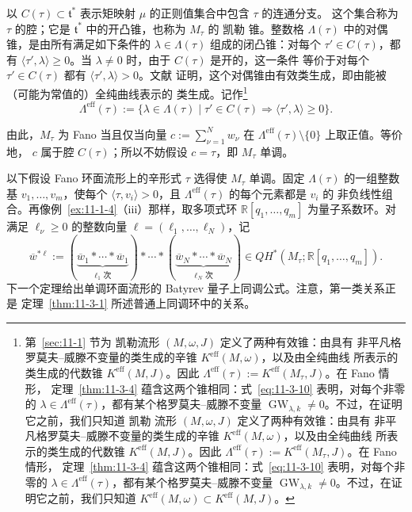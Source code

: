 以 $C(\tau)\subset\mathfrak t^*$ 表示矩映射 $\mu$ 的正则值集合中包含 $\tau$ 的连通分支。
这个集合称为 $\tau$ 的腔；它是 $\mathfrak t^*$ 中的开凸锥，也称为 $M_\tau$ 的 凯勒
锥。整数格 $\Lambda(\tau)$ 中的对偶锥，是由所有满足如下条件的
$\lambda\in\Lambda(\tau)$ 组成的闭凸锥：对每个 $\tau'\in C(\tau)$，都有
$\langle\tau',\lambda\rangle\geq0$。当 $\lambda\ne0$ 时，由于 $C(\tau)$ 是开的，这一条件
等价于对每个 $\tau'\in C(\tau)$ 都有 $\langle\tau',\lambda\rangle>0$。文献
 证明，这个对偶锥由有效类生成，即由能被（可能为常值的）全纯曲线表示的
类生成。记作\footnote{第~\ref{sec:11-1} 节为
凯勒流形 $(M,\omega,J)$ 定义了两种有效锥：由具有
非平凡格罗莫夫--威滕不变量的类生成的辛锥 $K^{\mathrm{eff}}(M,\omega)$，以及由全纯曲线
所表示的类生成的代数锥 $K^{\mathrm{eff}}(M,J)$。因此
$\Lambda^{\mathrm{eff}}(\tau):=K^{\mathrm{eff}}(M_\tau,J)$。在 Fano 情形，
定理~\ref{thm:11-3-4} 蕴含这两个锥相同：式~\eqref{eq:11-3-10} 表明，对每个非零的
$\lambda\in\Lambda^{\mathrm{eff}}(\tau)$，都有某个格罗莫夫--威滕不变量
$\operatorname{GW}_{\lambda,k}\ne0$。不过，在证明它之前，我们只知道 凯勒 流形 $(M,\omega,J)$ 定义了两种有效锥：由具有
非平凡格罗莫夫--威滕不变量的类生成的辛锥 $K^{\mathrm{eff}}(M,\omega)$，以及由全纯曲线
所表示的类生成的代数锥 $K^{\mathrm{eff}}(M,J)$。因此
$\Lambda^{\mathrm{eff}}(\tau):=K^{\mathrm{eff}}(M_\tau,J)$。在 Fano 情形，
定理~\ref{thm:11-3-4} 蕴含这两个锥相同：式~\eqref{eq:11-3-10} 表明，对每个非零的
$\lambda\in\Lambda^{\mathrm{eff}}(\tau)$，都有某个格罗莫夫--威滕不变量
$\operatorname{GW}_{\lambda,k}\ne0$。不过，在证明它之前，我们只知道
$K^{\mathrm{eff}}(M,\omega)\subset K^{\mathrm{eff}}(M,J)$。}
\[
  \Lambda^{\mathrm{eff}}(\tau):=
  \{\lambda\in\Lambda(\tau)\mid
  \tau'\in C(\tau)\Longrightarrow\langle\tau',\lambda\rangle\geq0\}.
\]

由此，$M_\tau$ 为 Fano 当且仅当向量
$c:=\sum_{\nu=1}^Nw_\nu$ 在 $\Lambda^{\mathrm{eff}}(\tau)\setminus\{0\}$ 上取正值。等价地，
$c$ 属于腔 $C(\tau)$；所以不妨假设 $c=\tau$，即 $M_\tau$ 单调。

以下假设 Fano 环面流形上的辛形式 $\tau$ 选得使 $M_\tau$ 单调。固定
$\Lambda(\tau)$ 的一组整数基 $v_1,\ldots,v_m$，使每个
$\langle\tau,v_i\rangle>0$，且 $\Lambda^{\mathrm{eff}}(\tau)$ 的每个元素都是 $v_i$ 的
非负线性组合。再像例~\ref{ex:11-1-4}（iii）那样，取多项式环
$\mathbb R[q_1,\ldots,q_m]$ 为量子系数环。对满足 $\ell_\nu\geq0$ 的整数向量
$\ell=(\ell_1,\ldots,\ell_N)$，记
\[
  \overline w^{*\ell}:=
  (\underbrace{\overline w_1*\cdots*\overline w_1}_{\ell_1\text{ 次}})*\cdots*
  (\underbrace{\overline w_N*\cdots*\overline w_N}_{\ell_N\text{ 次}})
  \in QH^*(M_\tau;\mathbb R[q_1,\ldots,q_m]).
\]
下一个定理给出单调环面流形的 Batyrev 量子上同调公式。注意，第一类关系正是
定理~\ref{thm:11-3-1} 所述普通上同调环中的关系。

